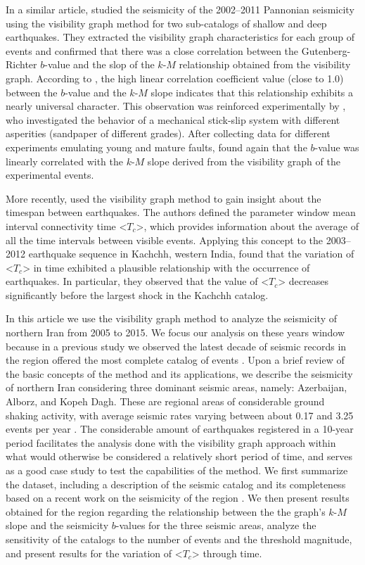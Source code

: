 In a similar article, \citet{Telesca2014} studied the seismicity of the 2002--2011 Pannonian seismicity using the visibility graph method for two sub-catalogs of shallow and deep earthquakes. They extracted the visibility graph characteristics for each group of events and confirmed that there was a close correlation between the Gutenberg-Richter $b$-value and the slop of the $k$-$M$ relationship obtained from the visibility graph. According to \citet{Telesca2014}, the high linear correlation coefficient value (close to 1.0) between the $b$-value and the $k$-$M$ slope indicates that this relationship exhibits a nearly universal character. This observation was reinforced experimentally by \citet{Telesca2014-pone}, who investigated the behavior of a mechanical stick-slip system with different asperities (sandpaper of different grades). After collecting data for different experiments emulating young and mature faults, \citet{Telesca2014-pone} found again that the $b$-value was linearly correlated with the $k$-$M$ slope derived from the visibility graph of the experimental events.

More recently, \citet{Telesca2016} used the visibility graph method to gain insight about the timespan between earthquakes. The authors defined the parameter window mean interval connectivity time <$T_c$>, which provides information about the average of all the time intervals between visible events. Applying this concept to the 2003--2012 earthquake sequence in Kachchh, western India, \citet{Telesca2016} found that the variation of <$T_c$> in time exhibited a plausible relationship with the occurrence of earthquakes. In particular, they observed that the value of <$T_c$> decreases significantly before the largest shock in the Kachchh catalog.

In this article we use the visibility graph method to analyze the seismicity of northern Iran from 2005 to 2015. We focus our analysis on these years window because in a previous study we observed the latest decade of seismic records in the region offered the most complete catalog of events \citep[e.g.][]{Khoshnevis2016}. Upon a brief review of the basic concepts of the method and its applications, we describe the seismicity of northern Iran considering three dominant seismic areas, namely: Azerbaijan, Alborz, and Kopeh Dagh. These are regional areas of considerable ground shaking activity, with average seismic rates varying between about 0.17 and 3.25 events per year \citep[e.g.,][]{Nemati2015}. The considerable amount of earthquakes registered in a 10-year period facilitates the analysis done with the visibility graph approach within what would otherwise be considered a relatively short period of time, and serves as a good case study to test the capabilities of the method. We first summarize the dataset, including a description of the seismic catalog and its completeness based on a recent work on the seismicity of the region \citep{Khoshnevis2016}. We then present results obtained for the region regarding the relationship between the the graph's $k$-$M$ slope and the seismicity $b$-values for the three seismic areas, analyze the sensitivity of the catalogs to the number of events and the threshold magnitude, and present results for the variation of <$T_c$> through time.


